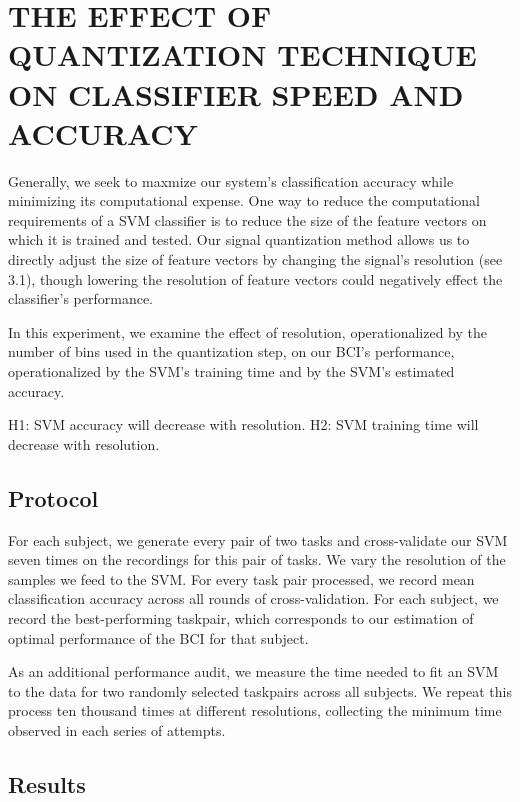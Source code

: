 \section{\uppercase{The effect of quantization technique on classifier speed and accuracy}}
\label{sec:quantization_eval}


Generally, we seek to maxmize our system's classification accuracy while minimizing its computational expense. One way to reduce the computational requirements of a SVM classifier is to reduce the size of the feature vectors on which it is trained and tested. Our signal quantization method allows us to directly adjust the size of feature vectors by changing the signal's resolution (see 3.1), though lowering the resolution of feature vectors could negatively effect the classifier's performance.

In this experiment, we examine the effect of resolution, operationalized by the number of bins used in the quantization step, on our BCI's performance, operationalized by the SVM's training time and by the SVM's estimated accuracy. 

H1: SVM accuracy will decrease with resolution.
H2: SVM training time will decrease with resolution.

\subsection{Protocol}

For each subject, we generate every pair of two tasks and cross-validate our SVM seven times on the recordings for this pair of tasks. We vary the resolution of the samples we feed to the SVM. For every task pair processed, we record mean classification accuracy across all rounds of cross-validation. For each subject, we record the best-performing taskpair, which corresponds to our estimation of optimal performance of the BCI for that subject.

As an additional performance audit, we measure the time needed to fit an SVM to the data for two randomly selected taskpairs across all subjects. We repeat this process ten thousand times at different resolutions, collecting the minimum time observed in each series of attempts.

\subsection{Results}

